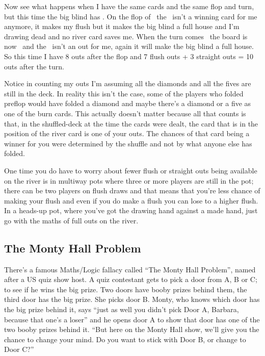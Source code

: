 Now see what happens when I have the same cards and the same flop and
turn, but this time the big blind has \As\Ah. On the flop of
\Ad\tens\eigd\, the \tend\ isn't a winning card for me anymore, it
makes my flush but it makes the big blind a full house and I'm drawing
dead and no river card saves me. When the turn comes \twoc\, the board
is now \Ad\tens\eigd\twoc\ and the \twod\ isn't an out for me, again
it will make the big blind a full house. So this time I have 8 outs
after the flop and 7 flush outs + 3 straight outs = 10 outs after the
turn.

Notice in counting my outs I'm assuming all the diamonds and all the
fives are still in the deck. In reality this isn't the case, some of
the players who folded preflop would have folded a diamond and maybe
there's a diamond or a five as one of the burn cards. This actually
doesn't matter because all that counts is that, in the shuffled-deck
at the time the cards were dealt, the card that is in the position of
the river card is one of your outs. The chances of that card being a
winner for you were determined by the shuffle and not by what anyone
else has folded.

One time you do have to worry about fewer flush or straight outs being
available on the river is in multiway pots where three or more players
are still in the pot; there can be two players on flush draws and that
means that you're less chance of making your flush and even if you do
make a flush you can lose to a higher flush. In a heads-up
pot, where you've got the drawing hand against a made hand, just go
with the maths of full outs on the river.

\subsection{The Monty Hall Problem}

There's a famous Maths/Logic fallacy called ``The Monty Hall
Problem'', named after a US quiz show host. A quiz contestant gets to
pick a door from A, B or C; to see if he wins the big prize. Two doors
have booby prizes behind them, the third door has the big prize. She picks
door B. Monty, who knows which door has the big prize behind it, says
``just as well you didn't pick Door A, Barbara, because that one's a
loser'' and he opens door A to show that door has one of the two booby
prizes behind it. ``But here on the Monty Hall show, we'll give you the
chance to change your mind. Do you want to stick with Door B, or
change to Door C?''

